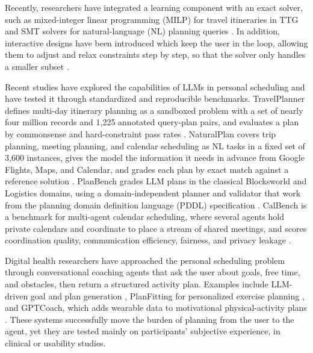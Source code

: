 \documentclass[runningheads]{llncs}
\begin{document}
Recently, researchers have integrated a learning component with an exact solver, such as mixed-integer linear programming (MILP) for travel itineraries in TTG \citep{ju2024ttg} and SMT solvers for natural-language (NL) planning queries \citep{maas_generating_2026,hao2025llmssolve}. In addition, interactive designs have been introduced which keep the user in the loop, allowing them to adjust and relax constraints step by step, so that the solver only handles a smaller subset  \citep{bilbily_space_2021}.

Recent studies have explored the capabilities of LLMs in personal scheduling and have tested it through standardized and reproducible benchmarks. TravelPlanner defines multi-day itinerary planning as a sandboxed problem with a set of nearly four million records and 1{,}225 annotated query-plan pairs, and evaluates a plan by commonsense and hard-constraint pass rates \citep{xie_travelplanner_2024}. NaturalPlan covers trip planning, meeting planning, and calendar scheduling as NL tasks in a fixed set of 3{,}600 instances, gives the model the information it needs in advance from Google Flights, Maps, and Calendar, and grades each plan by exact match against a reference solution \citep{zheng_natural_2024}. PlanBench grades LLM plans in the classical Blocksworld and Logistics domains, using a domain-independent planner and validator that work from the planning domain definition language (PDDL) specification \citep{valmeekam_planbench_2023}. CalBench is a benchmark for multi-agent calendar scheduling, where several agents hold private calendars and coordinate to place a stream of shared meetings, and scores coordination quality, communication efficiency, fairness, and privacy leakage \citep{calbench}. 



Digital health researchers have approached the personal scheduling problem through conversational coaching agents that ask the user about goals, free time, and obstacles, then return a structured activity plan. Examples include LLM-driven goal and plan generation \citep{james_toward_2025}, PlanFitting for personalized exercise planning \citep{shin_planfitting_2025}, and GPTCoach, which adds wearable data to motivational physical-activity plans \citep{jorke_gptcoach_2025}. These systems successfully move the burden of planning from the user to the agent, yet they are tested mainly on participants' subjective experience, in clinical or usability studies. 
\end{document}
